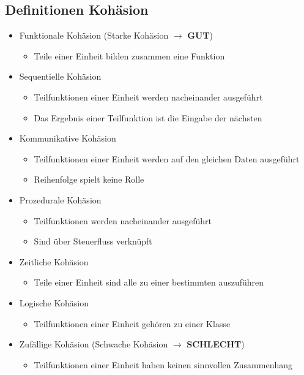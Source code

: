 \begin{multicols}{2}
\subsection{Definitionen Kohäsion}
\begin{itemize}
  \item Funktionale Kohäsion (Starke Kohäsion $\rightarrow$ \textbf{GUT})
  \begin{itemize}
    \item Teile einer Einheit bilden zusammen eine Funktion 
  \end{itemize}
  \item Sequentielle Kohäsion
   \begin{itemize}
    \item Teilfunktionen einer Einheit werden nacheinander ausgeführt
    \item Das Ergebnis einer Teilfunktion ist die Eingabe der nächsten
  \end{itemize}
  \item Kommunikative Kohäsion
  \begin{itemize}
    \item Teilfunktionen einer Einheit werden auf den gleichen Daten ausgeführt
    \item Reihenfolge spielt keine Rolle
  \end{itemize}
  \item Prozedurale Kohäsion
  \begin{itemize}
    \item Teilfunktionen werden nacheinander ausgeführt
    \item Sind über Steuerfluss verknüpft
  \end{itemize}
  \item Zeitliche Kohäsion
  \begin{itemize}
    \item Teile einer Einheit sind alle zu einer bestimmten auszuführen
  \end{itemize}
  \item Logische Kohäsion
  \begin{itemize}
    \item Teilfunktionen einer Einheit gehören zu einer Klasse
  \end{itemize}
  \item Zufällige Kohäsion (Schwache Kohäsion $\rightarrow$ \textbf{SCHLECHT})
  \begin{itemize}
    \item Teilfunktionen einer Einheit haben keinen sinnvollen Zusammenhang
  \end{itemize}
\end{itemize}
\end{multicols}

